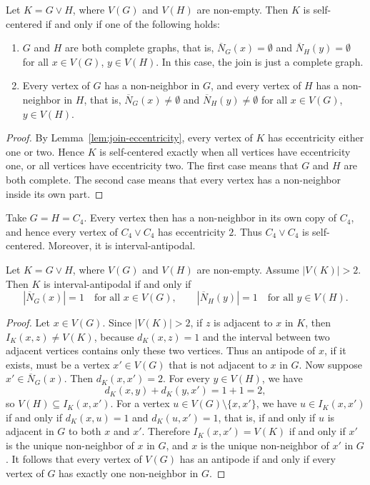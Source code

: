 \documentclass[a4paper,leqno]{amsart}
\begin{document}
\begin{cor}\label{cor:join-self-centered}
Let $K=G\vee H$, where $V(G)$ and $V(H)$ are non-empty. Then $K$ is
self-centered if and only if one of the following holds:
\begin{enumerate}
    \item $G$ and $H$ are both complete graphs, that is, $\overline N_G(x)=\emptyset$ and $\overline N_H(y)=\emptyset$ for all $x\in V(G)$, $y\in V(H)$. In this case, the join is just a complete graph.
    \item Every vertex of $G$ has a non-neighbor in $G$, and every
    vertex of $H$ has a non-neighbor in $H$, that is, $\overline N_G(x)\neq\emptyset$ and $\overline N_H(y)\neq\emptyset$ for all $x\in V(G)$, $y\in V(H)$.
\end{enumerate}
\end{cor}

\begin{proof}
By Lemma~\ref{lem:join-eccentricity}, every vertex of $K$ has eccentricity either one or two. Hence $K$ is self-centered exactly when all vertices have eccentricity one, or all vertices have eccentricity two. The first case means that $G$ and $H$ are both complete. The second case means that every vertex has a non-neighbor inside its own part.
\end{proof}

\begin{eg}
Take $G=H=C_4$. Every vertex then has a non-neighbor in its own copy of $C_4$, and hence every vertex of $C_4\vee C_4$ has eccentricity $2$. Thus $C_4\vee C_4$ is self-centered. Moreover, it is interval-antipodal.
\end{eg}
    
\begin{lem}\label{lem:join-interval-antipodal}
Let $K=G\vee H$, where $V(G)$ and $V(H)$ are non-empty. Assume
$|V(K)|>2$. Then $K$ is interval-antipodal if and only if $$
|\overline N_G(x)|=1\quad\text{for all }x\in V(G), \qquad|\overline N_H(y)|=1\quad\text{for all }y\in V(H).$$
\end{lem}

\begin{proof}
Let $x\in V(G)$. Since $|V(K)|>2$, if $z$ is adjacent to $x$ in $K$,
then $I_K(x,z)\neq V(K)$, because $d_K(x,z)=1$ and the interval between
two adjacent vertices contains only these two vertices. Thus an antipode of $x$, if it exists, must be a vertex $x'\in V(G)$ that is not adjacent to $x$ in $G$. Now suppose $x'\in \overline N_G(x)$. Then $d_K(x,x')=2$. For every $y\in V(H)$, we have
$$d_K(x,y)+d_K(y,x')=1+1=2,$$
so $V(H)\subseteq I_K(x,x')$. For a vertex $u\in V(G)\setminus\{x,x'\}$,
we have $u\in I_K(x,x')$ if and only if $d_K(x,u)=1$ and $d_K(u,x')=1$, that is, if and only if $u$ is adjacent in $G$ to both $x$ and $x'$. Therefore $I_K(x,x')=V(K)$ if and only if $x'$ is the unique non-neighbor of $x$ in $G$, and $x$ is the unique non-neighbor of $x'$ in $G$. It follows that every vertex of $V(G)$ has an antipode if and only if every vertex of $G$ has exactly one non-neighbor in $G$.
\end{proof}
\end{document}
